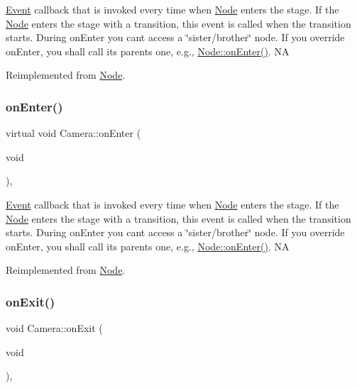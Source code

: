 \hyperlink{classEvent}{Event} callback that is invoked every time when \hyperlink{classNode}{Node} enters the \textquotesingle{}stage\textquotesingle{}. If the \hyperlink{classNode}{Node} enters the \textquotesingle{}stage\textquotesingle{} with a transition, this event is called when the transition starts. During on\+Enter you can\textquotesingle{}t access a \char`\"{}sister/brother\char`\"{} node. If you override on\+Enter, you shall call its parent\textquotesingle{}s one, e.\+g., \hyperlink{classNode_a7f51764c4afd5018a052b9ef71c03374}{Node\+::on\+Enter()}.  NA 

Reimplemented from \hyperlink{classNode_a7f51764c4afd5018a052b9ef71c03374}{Node}.

\mbox{\label{classCamera_af22f3064a50c98832f448d7167a1f3cd}} 
\subsubsection{\texorpdfstring{on\+Enter()}{onEnter()}\hspace{0.1cm}{\footnotesize\ttfamily [2/2]}}
{\footnotesize\ttfamily virtual void Camera\+::on\+Enter (\begin{DoxyParamCaption}\item[{void}]{ }\end{DoxyParamCaption})\hspace{0.3cm}{\ttfamily [override]}, {\ttfamily [virtual]}}

\hyperlink{classEvent}{Event} callback that is invoked every time when \hyperlink{classNode}{Node} enters the \textquotesingle{}stage\textquotesingle{}. If the \hyperlink{classNode}{Node} enters the \textquotesingle{}stage\textquotesingle{} with a transition, this event is called when the transition starts. During on\+Enter you can\textquotesingle{}t access a \char`\"{}sister/brother\char`\"{} node. If you override on\+Enter, you shall call its parent\textquotesingle{}s one, e.\+g., \hyperlink{classNode_a7f51764c4afd5018a052b9ef71c03374}{Node\+::on\+Enter()}.  NA 

Reimplemented from \hyperlink{classNode_a7f51764c4afd5018a052b9ef71c03374}{Node}.

\mbox{\label{classCamera_a21080d4de388ac7b9a02ccf77aaacf92}} 
\subsubsection{\texorpdfstring{on\+Exit()}{onExit()}\hspace{0.1cm}{\footnotesize\ttfamily [1/2]}}
{\footnotesize\ttfamily void Camera\+::on\+Exit (\begin{DoxyParamCaption}\item[{void}]{ }\end{DoxyParamCaption})\hspace{0.3cm}{\ttfamily [override]}, {\ttfamily [virtual]}}

